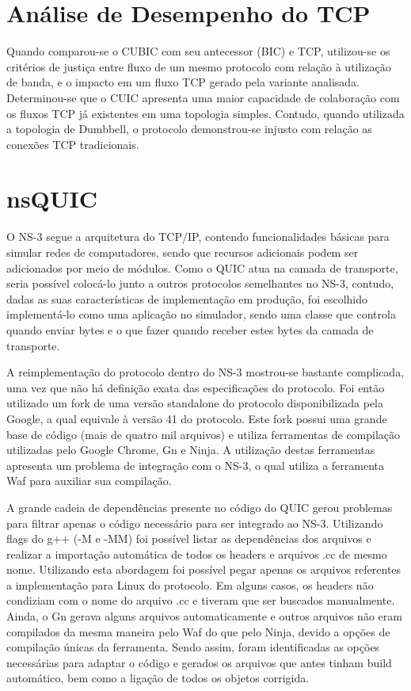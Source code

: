\documentclass{article}
\begin{document}
\section{Análise de Desempenho do TCP}
Quando comparou-se o CUBIC com seu antecessor (BIC) e TCP, utilizou-se os critérios de justiça entre fluxo de um mesmo
protocolo com relação à utilização de banda, e o impacto em um fluxo TCP gerado pela variante analisada. Determinou-se
que o CUIC apresenta uma maior capacidade de colaboração com os fluxos TCP já existentes em uma topologia simples.
Contudo, quando utilizada a topologia de Dumbbell, o protocolo demonstrou-se injusto com relação as conexões TCP
tradicionais.

\section{nsQUIC}
O NS-3 segue a arquitetura do TCP/IP, contendo funcionalidades básicas para simular redes de computadores, sendo que
recursos adicionais podem ser adicionados por meio de módulos. Como o QUIC atua na camada de transporte, seria possível
colocá-lo junto a outros protocolos semelhantes no NS-3, contudo, dadas as suas características de implementação em
produção, foi escolhido implementá-lo como uma aplicação no simulador, sendo uma classe que controla quando enviar bytes
e o que fazer quando receber estes bytes da camada de transporte.

A reimplementação do protocolo dentro do NS-3 mostrou-se bastante complicada, uma vez que não há definição exata das
especificações do protocolo. Foi então utilizado um fork de uma versão standalone do protocolo disponibilizada pela
Google, a qual equivale à versão 41 do protocolo. Este fork possui uma grande base de código (mais de quatro mil
arquivos) e utiliza ferramentas de compilação utilizadas pelo Google Chrome, Gn e Ninja. A utilização destas ferramentas
apresenta um problema de integração com o NS-3, o qual utiliza a ferramenta Waf para auxiliar sua compilação.

A grande cadeia de dependências presente no código do QUIC gerou problemas para filtrar apenas o código necessário para
ser integrado  ao NS-3. Utilizando flags do g++ (-M e -MM) foi possível listar as dependências dos arquivos e realizar a
importação automática de todos os headers e arquivos .cc de mesmo nome. Utilizando esta abordagem foi possível pegar
apenas os arquivos referentes a implementação para Linux do protocolo. Em alguns casos, os headers não condiziam com o
nome do arquivo .cc e tiveram que ser buscados manualmente. Ainda, o Gn gerava alguns arquivos automaticamente e
outros arquivos não eram compilados da mesma maneira pelo Waf do que pelo Ninja, devido a opções de compilação únicas da
ferramenta. Sendo assim, foram identificadas as opções necessárias para adaptar o código e gerados os arquivos que antes
tinham build automático, bem como a ligação de todos os objetos corrigida.
\end{document}
